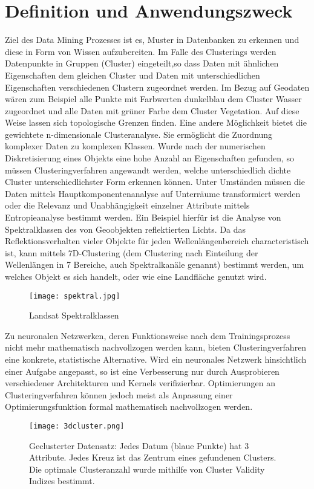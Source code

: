 \documentclass[11pt,fleqn]{book}
\begin{document}
\section{Definition und Anwendungszweck}
Ziel des Data Mining Prozesses ist es, Muster in Datenbanken zu erkennen und diese in Form von Wissen aufzubereiten. Im Falle des Clusterings werden Datenpunkte in Gruppen (Cluster) eingeteilt,so dass Daten mit ähnlichen Eigenschaften dem gleichen Cluster und Daten mit unterschiedlichen Eigenschaften verschiedenen Clustern zugeordnet werden. Im Bezug auf Geodaten wären zum Beispiel alle Punkte mit Farbwerten dunkelblau dem Cluster Wasser zugeordnet und alle Daten mit grüner Farbe dem Cluster Vegetation. Auf diese Weise lassen sich topologische Grenzen finden. Eine andere Möglichkeit bietet die gewichtete n-dimensionale Clusteranalyse. Sie ermöglicht die Zuordnung komplexer Daten zu komplexen Klassen. Wurde nach der numerischen Diskretisierung eines Objekts eine hohe Anzahl an Eigenschaften gefunden, so müssen Clusteringverfahren angewandt werden, welche unterschiedlich dichte Cluster unterschiedlichster Form erkennen können. Unter Umständen müssen die Daten mittels Hauptkomponentenanalyse auf Unterräume transformiert werden oder die Relevanz und Unabhängigkeit einzelner Attribute mittels Entropieanalyse bestimmt werden. Ein Beispiel hierfür ist die Analyse von Spektralklassen des von Geoobjekten reflektierten Lichts. Da das Reflektionsverhalten vieler Objekte für jeden Wellenlängenbereich characteristisch ist, kann mittels 7D-Clustering (dem Clustering nach Einteilung der Wellenlängen in 7 Bereiche, auch Spektralkanäle genannt) bestimmt werden, um welches Objekt es sich handelt, oder wie eine Landfläche genutzt wird.
\begin{figure}[H]
\centering
\texttt{[image: spektral.jpg]}
\caption{Landsat Spektralklassen \protect\footnotemark}
\end{figure}
Zu neuronalen Netzwerken, deren Funktionsweise nach dem Trainingsprozess nicht mehr mathematisch nachvollzogen werden kann, bieten Clusteringverfahren eine konkrete, statistische Alternative. Wird ein neuronales Netzwerk hinsichtlich einer Aufgabe angepasst, so ist eine Verbesserung nur durch Ausprobieren verschiedener Architekturen und Kernels verifizierbar. Optimierungen an Clusteringverfahren können jedoch meist als Anpassung einer Optimierungsfunktion formal mathematisch nachvollzogen werden.

\begin{figure}[h]
\centering
\texttt{[image: 3dcluster.png]}
\caption{Geclusterter Datensatz: Jedes Datum (blaue Punkte) hat 3 Attribute. Jedes Kreuz ist das Zentrum eines gefundenen Clusters. Die optimale Clusteranzahl wurde mithilfe von Cluster Validity Indizes bestimmt.}\label{cluster}
\end{figure}
\end{document}
